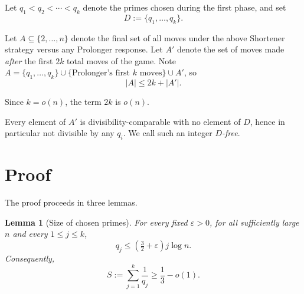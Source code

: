 \documentclass{article}
\newtheorem{lemma}{Lemma}
\begin{document}
Let $q_1 < q_2 < \cdots < q_k$ denote the primes chosen during the first phase, and set
\[
D := \{q_1, \ldots, q_k\}.
\]

Let $A \subseteq \{2, \ldots, n\}$ denote the final set of all moves under the above Shortener strategy versus any Prolonger response. Let $A'$ denote the set of moves made \emph{after} the first $2k$ total moves of the game. Note $A = \{q_1, \ldots, q_k\} \cup \{\text{Prolonger's first } k\text{ moves}\} \cup A'$, so
\[
|A| \le 2k + |A'|.
\]

Since $k = o(n)$, the term $2k$ is $o(n)$.

Every element of $A'$ is divisibility-comparable with no element of $D$, hence in particular not divisible by any $q_i$. We call such an integer \emph{$D$-free}.

\section{Proof}

The proof proceeds in three lemmas.

\begin{lemma}[Size of chosen primes]
\label{lem:prime-bound}
For every fixed $\varepsilon > 0$, for all sufficiently large $n$ and every $1 \le j \le k$,
\[
q_j \le \left(\tfrac{3}{2} + \varepsilon\right) j \log n.
\]
Consequently,
\[
S := \sum_{j = 1}^{k} \frac{1}{q_j} \ge \frac{1}{3} - o(1).
\]
\end{lemma}
\end{document}
